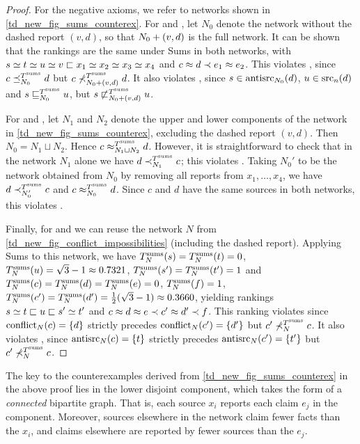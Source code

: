 \begin{proof}
    For the negative axioms, we refer to networks shown in
    \cref{td_new_fig_sums_counterex}.
    For \freshposresp{} and \sourceposresp{}, let $N_0$ denote the network
    without the dashed report $(v, d)$, so that ${N_0} + ({v}, {d})$ is the
    full network. It can be shown that the rankings are the same under Sums in
    both networks, with $s \simeq t \simeq u \simeq v \sqsubset x_1 \simeq x_2 \simeq x_3 \simeq
    x_4$ and $c \approx d \prec e_1 \approx e_2$. This violates \freshposresp{}, since
    $c \preceq_{N_0}^{T^{\operatorname{sums}}} d$ but $c \not\prec_{{N_0} + ({v}, {d})}^{T^{\operatorname{sums}}} d$.
    It also violates \sourceposresp{}, since $s \in \operatorname{antisrc}_{N_0}(d)$, $u \in
    \operatorname{src}_n(d)$ and $s \sqsubseteq_{N_0}^{T^{\operatorname{sums}}} u$, but $s
    \not\sqsubset_{{N_0} + ({v}, {d})}^{T^{\operatorname{sums}}} u$.

    For \classicalindependence{} and \disjointindependence{}, let $N_1$ and
    $N_2$ denote the upper and lower components of the network in
    \cref{td_new_fig_sums_counterex}, excluding the dashed report $(v, d)$.
    Then $N_0 = N_1 \sqcup N_2$. Hence $c \approx_{N_1 \sqcup N_2}^{T^{\operatorname{sums}}} d$.
    However, it is straightforward to check that in the network $N_1$ alone we
    have $d \prec_{N_1}^{T^{\operatorname{sums}}} c$; this violates \disjointindependence{}.
    Taking $N_0'$ to be the network obtained from $N_0$ by removing all
    reports from $x_1,\ldots,x_4$, we have $d \prec_{N_0'}^{T^{\operatorname{sums}}} c$ and $c
    \approx_{N_0}^{T^{\operatorname{sums}}} d$. Since $c$ and $d$ have the same sources in both
    networks, this violates \classicalindependence{}.

    Finally, for \conflictcoherence{} and \anticoherence{} we can reuse the
    network $N$ from \cref{td_new_fig_conflict_impossibilities} (including the
    dashed report). Applying Sums to this network, we have $T^{\operatorname{sums}}_N(s) =
    T^{\operatorname{sums}}_N(t) = 0$, $T^{\operatorname{sums}}_N(u) = \sqrt{3} - 1 \approx 0.7321$, $T^{\operatorname{sums}}_N(s') =
    T^{\operatorname{sums}}_N(t') = 1$ and $T^{\operatorname{sums}}_N(c) = T^{\operatorname{sums}}_N(d) = T^{\operatorname{sums}}_N(e) = 0$,
    $T^{\operatorname{sums}}_N(f) = 1$, $T^{\operatorname{sums}}_N(c') = T^{\operatorname{sums}}_N(d') = \frac{1}{2}(\sqrt{3} - 1)
    \approx 0.3660$, yielding rankings $s \simeq t \sqsubset u \sqsubset s' \simeq t'$ and $c
    \approx d \approx e \prec c' \approx d' \prec f$. This ranking violates
    \conflictcoherence{} since $\operatorname{conflict}_N(c) = \{d\}$ strictly precedes
    $\operatorname{conflict}_N(c') = \{d'\}$ but $c' \not\prec_N^{T^{\operatorname{sums}}} c$. It also violates
    \anticoherence{}, since $\operatorname{antisrc}_N(c) = \{t\}$ strictly precedes
    $\operatorname{antisrc}_N(c') = \{t'\}$ but $c' \not\prec_N^{T^{\operatorname{sums}}} c$.
\end{proof}

The key to the counterexamples derived from \cref{td_new_fig_sums_counterex} in
the above proof lies in the lower disjoint component, which takes the form of a
\emph{connected} bipartite graph. That is, each source $x_i$ reports each claim
$e_j$ in the component. Moreover, sources elsewhere in the network claim fewer
facts than the $x_i$, and claims elsewhere are reported by fewer sources than
the $e_j$.

